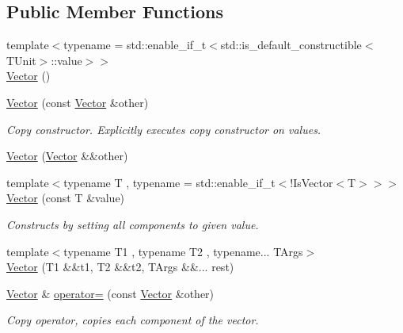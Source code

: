 \subsection*{Public Member Functions}
\begin{DoxyCompactItemize}
\item 
{\footnotesize template$<$typename  = std\+::enable\+\_\+if\+\_\+t$<$std\+::is\+\_\+default\+\_\+constructible$<$\+T\+Unit$>$\+::value$>$$>$ }\\\hyperlink{classVector_a9861ef252299f5ec6ba668fdfb58bdac}{Vector} ()
\item 
\hypertarget{classVector_a4fea692f3d2d03b29f07fe4ed857d3fe}{}\label{classVector_a4fea692f3d2d03b29f07fe4ed857d3fe} 
\hyperlink{classVector_a4fea692f3d2d03b29f07fe4ed857d3fe}{Vector} (const \hyperlink{classVector}{Vector} \&other)
\begin{DoxyCompactList}\small\item\em Copy constructor. Explicitly executes copy constructor on values. \end{DoxyCompactList}\item 
\hyperlink{classVector_a22750ab935dc70912a8ce6f144077991}{Vector} (\hyperlink{classVector}{Vector} \&\&other)
\item 
\hypertarget{classVector_aa3460d35087956191d679aae646bacae}{}\label{classVector_aa3460d35087956191d679aae646bacae} 
{\footnotesize template$<$typename T , typename  = std\+::enable\+\_\+if\+\_\+t$<$!\+Is\+Vector$<$\+T$>$$>$$>$ }\\\hyperlink{classVector_aa3460d35087956191d679aae646bacae}{Vector} (const T \&value)
\begin{DoxyCompactList}\small\item\em Constructs by setting all components to given value. \end{DoxyCompactList}\item 
{\footnotesize template$<$typename T1 , typename T2 , typename... T\+Args$>$ }\\\hyperlink{classVector_a3d44df3f400c3c16f01e6802e3046389}{Vector} (T1 \&\&t1, T2 \&\&t2, T\+Args \&\&... rest)
\item 
\hypertarget{classVector_a0b91248b376cb4ee66319973517669b4}{}\label{classVector_a0b91248b376cb4ee66319973517669b4} 
\hyperlink{classVector}{Vector} \& \hyperlink{classVector_a0b91248b376cb4ee66319973517669b4}{operator=} (const \hyperlink{classVector}{Vector} \&other)
\begin{DoxyCompactList}\small\item\em Copy operator, copies each component of the vector. \end{DoxyCompactList}\item 

\end{DoxyCompactItemize}
